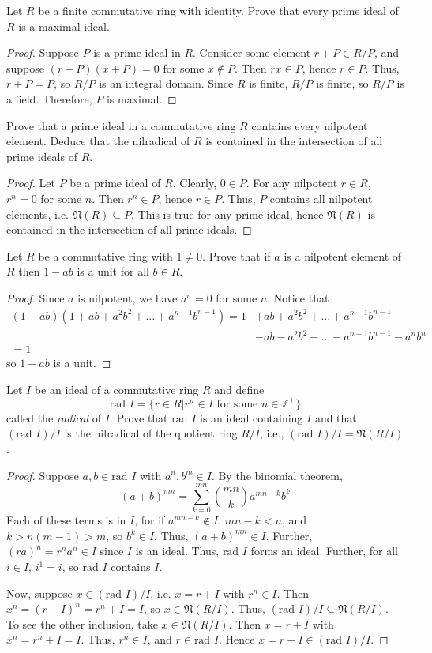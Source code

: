 \documentclass[12pt,leqno]{book}
\numberwithin{equation}{section}
\newcommand{\question}[2] {\vspace{.25in}\noindent\fbox{#1} #2 \vspace{.10in}}
\theoremstyle{definition}
\begin{document}
\question{19}{Let $R$ be a finite commutative ring with identity. Prove that every prime ideal of $R$ is a maximal ideal.}

\begin{proof}
 Suppose $P$ is a prime ideal in $R$. Consider some element $r+P\in R/P$, and suppose $(r+P)(x+P)=0$ for some $x\not\in P$. Then $rx\in P$, hence $r\in P$. Thus, $r+P=P$, so $R/P$ is an integral domain. Since $R$ is finite, $R/P$ is finite, so $R/P$ is a field. Therefore, $P$ is maximal.
\end{proof}

\question{26}{Prove that a prime ideal in a commutative ring $R$ contains every nilpotent element. Deduce that the nilradical of $R$ is contained in the intersection of all prime ideals of $R$.}

\begin{proof}
Let $P$ be a prime ideal of $R$. Clearly, $0\in P$. For any nilpotent $r\in R$, $r^n=0$ for some $n$. Then $r^n\in P$, hence $r\in P$. Thus, $P$ contains all nilpotent elements, i.e. $\mathfrak{N}(R)\subseteq P$. This is true for any prime ideal, hence $\mathfrak{N}(R)$ is contained in the intersection of all prime ideals.
\end{proof}

\question{27}{Let $R$ be a commutative ring with $1\not=0$. Prove that if $a$ is a nilpotent element of $R$ then $1-ab$ is a unit for all $b\in R$.}

\begin{proof}
 Since $a$ is nilpotent, we have $a^n=0$ for some $n$. Notice that \begin{align*}(1-ab)(1+ab+a^2b^2+\hdots+a^{n-1}b^{n-1})=1&+ab+a^2b^2+\hdots+a^{n-1}b^{n-1}\\&-ab-a^2b^2-\hdots-a^{n-1}b^{n-1}-a^nb^n\\=1\end{align*} so $1-ab$ is a unit.
\end{proof}

\question{30}{Let $I$ be an ideal of a commutative ring $R$ and define \[\text{rad }I=\{r\in R|r^n\in I\text{ for some }n\in\mathbb{Z}^+\}\] called the \textit{radical} of $I$. Prove that $\text{rad }I$ is an ideal containing $I$ and that $(\text{rad }I)/I$ is the nilradical of the quotient ring $R/I$, i.e., $(\text{rad }I)/I=\mathfrak{N}(R/I)$.}

\begin{proof}
 Suppose $a,b\in\text{rad }I$ with $a^n,b^m\in I$. By the binomial theorem, \[(a+b)^{mn}=\sum_{k=0}^{mn}{mn\choose k}a^{mn-k}b^k\] Each of these terms is in $I$, for if $a^{mn-k}\notin I$, $mn-k<n$, and $k>n(m-1)>m$, so $b^k\in I$. Thus, $(a+b)^{mn}\in I$. Further, $(ra)^n=r^na^n\in I$ since $I$ is an ideal. Thus, $\text{rad }I$ forms an ideal. Further, for all $i\in I$, $i^1=i$, so $\text{rad }I$ contains $I$.

Now, suppose $x\in(\text{rad }I)/I$, i.e. $x=r+I$ with $r^n\in I$. Then $x^n=(r+I)^n=r^n+I=I$, so $x\in\mathfrak{N}(R/I)$. Thus, $(\text{rad }I)/I\subseteq\mathfrak{N}(R/I)$. To see the other inclusion, take $x\in\mathfrak{N}(R/I)$. Then $x=r+I$ with $x^n=r^n+I=I$. Thus, $r^n\in I$, and $r\in\text{rad }I$. Hence $x=r+I\in(\text{rad }I)/I$.
\end{proof}
\end{document}
